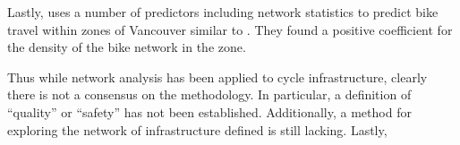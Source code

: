\documentclass[11pt]{article} %
\begin{document}
Lastly, \cite{osama2017models} uses a number of predictors including network statistics to predict bike travel within zones of Vancouver similar to \cite{schoner2014missing}. They found a positive coefficient for the density of the bike network in the zone. 

Thus while network analysis has been applied to cycle infrastructure, clearly there is not a consensus on the methodology. In particular, a definition of ``quality'' or ``safety'' has not been established. Additionally, a method for exploring the network of infrastructure defined is still lacking. Lastly,  

%
%
\end{document}
